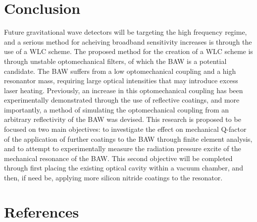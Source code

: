 \documentclass[aps,  
                a4paper, 
                amsmath, 
                amssymb, 
                preprint,
                tightenlines,  
                amsfonts,
                nofootinbib,
                onecolumn,
                titlepage,
                10pt
            ]{revtex4-2}
\begin{document}
    \section{Conclusion}
    Future gravitational wave detectors will be targeting the high frequency regime, and a serious method for acheiving broadband sensitivity increases is through the use of a WLC scheme. The proposed method for the creation of a WLC scheme is through unstable optomechanical filters, of which the BAW is a potential candidate. The BAW suffers from a low optomechanical coupling and a high resonantor mass, requiring large optical intensities that may introduce excess laser heating. Previously, an increase in this optomechanical coupling has been experimentally demonstrated through the use of reflective coatings, and more importantly, a method of simulating the optomechanical coupling from an arbitrary reflectivity of the BAW was devised. This research is proposed to be focused on two main objectives: to investigate the effect on mechanical Q-factor of the application of further coatings to the BAW through finite element analysis, and to attempt to experimentally measure the radiation pressure excite of the mechanical resonance of the BAW. This second objective will be completed through first placing the existing optical cavity within a vacuum chamber, and then, if need be, applying more silicon nitride coatings to the resonator. 

    \newpage
    \section*{References}
    \nocite{*}
    
    
\end{document}

